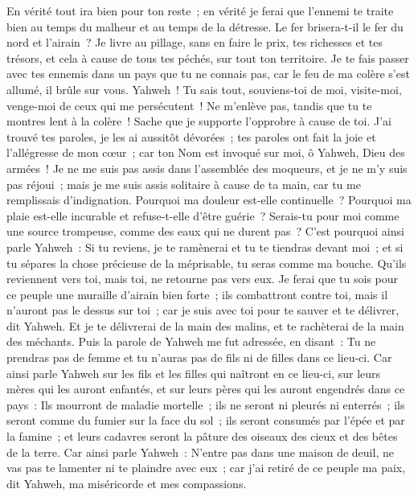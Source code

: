 \begin{multicols}{2}
En vérité tout ira bien pour ton reste~; en vérité je ferai que l'ennemi te traite bien au temps du malheur et au temps de la détresse.
Le fer brisera-t-il le fer du nord et l'airain~?
Je livre au pillage, sans en faire le prix, tes richesses et tes trésors, et cela à cause de tous tes péchés, sur tout ton territoire.
Je te fais passer avec tes ennemis dans un pays que tu ne connais pas, car le feu de ma colère s'est allumé, il brûle sur vous.
Yahweh~! Tu sais tout, souviens-toi de moi, visite-moi, venge-moi de ceux qui me persécutent~! Ne m'enlève pas, tandis que tu te montres lent à la colère~! Sache que je supporte l'opprobre à cause de toi.
J'ai trouvé tes paroles, je les ai aussitôt dévorées~; tes paroles ont fait la joie et l'allégresse de mon cœur~; car ton Nom est invoqué sur moi, ô Yahweh, Dieu des armées~!
Je ne me suis pas assis dans l'assemblée des moqueurs, et je ne m'y suis pas réjoui~; mais je me suis assis solitaire à cause de ta main, car tu me remplissais d'indignation.
Pourquoi ma douleur est-elle continuelle~? Pourquoi ma plaie est-elle incurable et refuse-t-elle d'être guérie~? Serais-tu pour moi comme une source trompeuse, comme des eaux qui ne durent pas~?
C'est pourquoi ainsi parle Yahweh~: Si tu reviens, je te ramènerai et tu te tiendras devant moi~; et si tu sépares la chose précieuse de la méprisable, tu seras comme ma bouche. Qu'ils reviennent vers toi, mais toi, ne retourne pas vers eux.
Je ferai que tu sois pour ce peuple une muraille d'airain bien forte~; ils combattront contre toi, mais il n'auront pas le dessus sur toi~; car je suis avec toi pour te sauver et te délivrer, dit Yahweh.
Et je te délivrerai de la main des malins, et te rachèterai de la main des méchants.
\VerseOne{}Puis la parole de Yahweh me fut adressée, en disant~:
Tu ne prendras pas de femme et tu n'auras pas de fils ni de filles dans ce lieu-ci.
Car ainsi parle Yahweh sur les fils et les filles qui naîtront en ce lieu-ci, sur leurs mères qui les auront enfantés, et sur leurs pères qui les auront engendrés dans ce pays~:
Ils mourront de maladie mortelle~; ils ne seront ni pleurés ni enterrés~; ils seront comme du fumier sur la face du sol~; ils seront consumés par l'épée et par la famine~; et leurs cadavres seront la pâture des oiseaux des cieux et des bêtes de la terre.
Car ainsi parle Yahweh~: N'entre pas dans une maison de deuil, ne vas pas te lamenter ni te plaindre avec eux~; car j'ai retiré de ce peuple ma paix, dit Yahweh, ma miséricorde et mes compassions.

\end{multicols}
